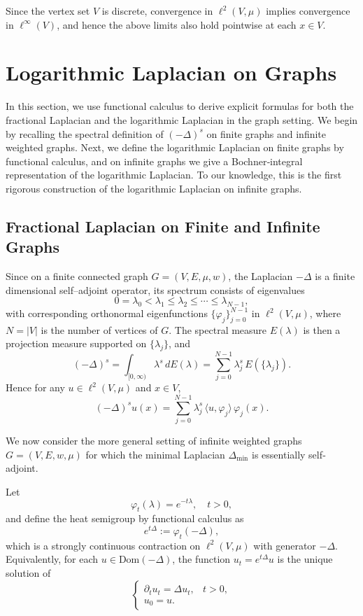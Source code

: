 \documentclass[reqno,12pt]{amsart}
\numberwithin{equation}{section}
\begin{document}
Since the vertex set \(V\) is discrete, convergence in \(\ell^2(V,\mu)\) implies convergence in \(\ell^\infty(V)\), and hence the above limits also hold pointwise at each \(x\in V\).  


\section{Logarithmic Laplacian on Graphs}

In this section, we use functional calculus to derive explicit formulas for both the fractional Laplacian and the logarithmic Laplacian in the graph setting.  We begin by recalling the spectral definition of $(-\Delta)^s$ on finite graphs and infinite weighted graphs.  Next, we define the logarithmic Laplacian on finite graphs by functional calculus, and on infinite graphs we give a Bochner‐integral representation of the logarithmic Laplacian.  To our knowledge, this is the first rigorous construction of the logarithmic Laplacian on infinite graphs.


\subsection{Fractional Laplacian on Finite and Infinite Graphs}

Since on a finite connected graph \(G=(V,E,\mu,w)\), the Laplacian \(-\Delta\) is a finite dimensional self–adjoint operator, its spectrum consists of eigenvalues
\[
0=\lambda_{0}<\lambda_{1}\le\lambda_{2}\le\cdots\le\lambda_{N-1},
\]
with corresponding orthonormal eigenfunctions \(\{\varphi_{j}\}_{j=0}^{N-1}\) in \(\ell^2(V,\mu)\), where \(N = |V|\) is the number of vertices of \(G\). The spectral measure \(E(\lambda)\) is then a projection measure supported on \(\{\lambda_j\}\), and
\[
(-\Delta)^{s}
=\int_{[0,\infty)}\lambda^{s}\,dE(\lambda)
=\sum_{j=0}^{N-1}\lambda_j^{s}\,E(\{\lambda_j\}).
\]
Hence for any \(u\in\ell^2(V,\mu)\) and \(x\in V\),
\[
(-\Delta)^{s}u(x)
=\sum_{j=0}^{N-1}\lambda_j^{s}\,\langle u,\varphi_j\rangle\,\varphi_j(x).
\]

We now consider the more general setting of infinite weighted graphs $G=(V,E,w,\mu)$ for which the minimal Laplacian $\Delta_{\mathrm{min}}$ is essentially self‐adjoint.



Let 
\[
\varphi_t(\lambda)=e^{-t\lambda},\quad t>0,
\]
and define the heat semigroup by functional calculus as
\[
e^{t\Delta}:=\varphi_t(-\Delta),
\]
which is a strongly continuous contraction on \(\ell^2(V,\mu)\) with generator \(-\Delta\).  Equivalently, for each \(u\in\mathrm{Dom}(-\Delta)\), the function \(u_t=e^{t\Delta}u\) is the unique solution of
\[
\begin{cases}
	\partial_t u_t = \Delta u_t, & t>0,\\
	u_0 = u.
\end{cases}
\]
\end{document}
